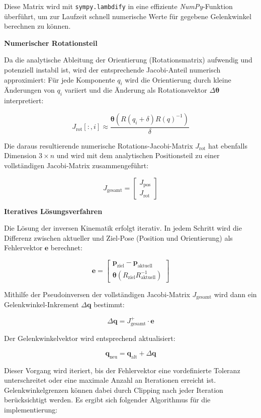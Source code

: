 Diese Matrix wird mit \texttt{sympy.lambdify} in eine effiziente \textit{NumPy}-Funktion überführt, um zur Laufzeit schnell numerische Werte für gegebene Gelenkwinkel berechnen zu können.

\vspace{1em}
\noindent
\textbf{Numerischer Rotationsteil}

Da die analytische Ableitung der Orientierung (Rotationsmatrix) aufwendig und potenziell instabil ist, wird der entsprechende Jacobi-Anteil numerisch approximiert:
Für jede Komponente $q_i$ wird die Orientierung durch kleine Änderungen von $q_i$ variiert und die Änderung als Rotationsvektor $\Delta \boldsymbol{\theta}$ interpretiert:

\[
J_{\text{rot}}[:,i] \approx \frac{\boldsymbol{\theta}(R(q_i + \delta) R(q)^{-1})}{\delta}
\]

Die daraus resultierende numerische Rotations-Jacobi-Matrix $J_{\text{rot}}$ hat ebenfalls Dimension $3 \times n$ und wird mit dem analytischen Positionsteil zu einer vollständigen Jacobi-Matrix zusammengeführt:

\[
J_{\text{gesamt}} =
\begin{bmatrix}
J_{\text{pos}} \\
J_{\text{rot}}
\end{bmatrix}
\]

\vspace{1em}
\noindent
\textbf{Iteratives Lösungsverfahren}

Die Lösung der inversen Kinematik erfolgt iterativ. In jedem Schritt wird die Differenz zwischen aktueller und Ziel-Pose (Position und Orientierung) als Fehlervektor $\mathbf{e}$ berechnet:

\[
\mathbf{e} =
\begin{bmatrix}
\mathbf{p}_{\text{ziel}} - \mathbf{p}_{\text{aktuell}} \\
\boldsymbol{\theta}(R_{\text{ziel}} R_{\text{aktuell}}^{-1})
\end{bmatrix}
\]

Mithilfe der Pseudoinversen der vollständigen Jacobi-Matrix $J_{\text{gesamt}}$ wird dann ein Gelenkwinkel-Inkrement $\Delta \mathbf{q}$ bestimmt:

\[
\Delta \mathbf{q} = J_{\text{gesamt}}^{+} \cdot \mathbf{e}
\]

Der Gelenkwinkelvektor wird entsprechend aktualisiert:

\[
\mathbf{q}_{\text{neu}} = \mathbf{q}_{\text{alt}} + \Delta \mathbf{q}
\]

Dieser Vorgang wird iteriert, bis der Fehlervektor eine vordefinierte Toleranz unterschreitet oder eine maximale Anzahl an Iterationen erreicht ist.
Gelenkwinkelgrenzen können dabei durch Clipping nach jeder Iteration berücksichtigt werden.
Es ergibt sich folgender Algorithmus für die implementierung:

